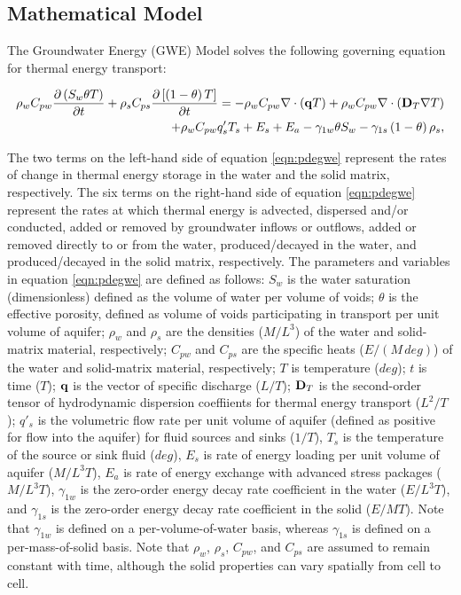 \subsection{Mathematical Model} \label{sec:mathmodel}

The Groundwater Energy (GWE) Model solves the following governing equation for thermal energy transport:

\begin{equation}
\label{eqn:pdegwe}
\begin{aligned}
\rho_w C_{pw} \frac {\partial \left ( S_w \theta T \right )}{\partial t}
+ \rho_s C_{ps} \frac {\partial \left [ \left (1 - \theta \right ) T \right ]}{\partial t}
= - \rho_w C_{pw} \nabla \cdot \left ( \mathbf{q} T  \right ) 
+ \rho_w C_{pw} \nabla \cdot \left ( \mathbf{D}_T \nabla T \right )\\
+ \rho_w C_{pw} q'_s T_s + E_s + E_a - \gamma_{1w} \theta S_w
- \gamma_{1s} \left (1 - \theta \right ) \rho_s,
\end{aligned}
\end{equation}

\noindent The two terms on the left-hand side of equation \ref{eqn:pdegwe} represent the rates of change in thermal energy storage in the water and the solid matrix, respectively. The six terms on the right-hand side of equation \ref{eqn:pdegwe} represent the rates at which thermal energy is advected, dispersed and/or conducted, added or removed by groundwater inflows or outflows, added or removed directly to or from the water, produced/decayed in the water, and produced/decayed in the solid matrix, respectively. The parameters and variables in equation \ref{eqn:pdegwe} are defined as follows: $S_w$ is the water saturation (dimensionless) defined as the volume of water per volume of voids; $\theta$ is the effective porosity, defined as volume of voids participating in transport per unit volume of aquifer; $\rho_w$ and $\rho_s$ are the densities ($M/L^3$) of the water and solid-matrix material, respectively; $C_{pw}$ and $C_{ps}$ are the specific heats ($E/(M \, deg)$) of the water and solid-matrix material, respectively; $T$ is temperature ($deg$); $t$ is time ($T$); $\mathbf{q}$ is the vector of specific discharge ($L/T$); $\mathbf{D}_T$ is the second-order tensor of hydrodynamic dispersion coeffiients for thermal energy transport ($L^2/T$); $q'_s$ is the volumetric flow rate per unit volume of aquifer (defined as positive for flow into the aquifer) for fluid sources and sinks ($1/T$), $T_s$ is the temperature of the source or sink fluid ($deg$), $E_s$ is rate of energy loading per unit volume of aquifer ($M/L^3T$), $E_a$ is rate of energy exchange with advanced stress packages ($M/L^3T$), $\gamma_{1w}$ is the zero-order energy decay rate coefficient in the water ($E/L^3T$), and $\gamma_{1s}$ is the zero-order energy decay rate coefficient in the solid ($E/MT$). Note that $\gamma_{1w}$ is defined on a per-volume-of-water basis, whereas $\gamma_{1s}$ is defined on a per-mass-of-solid basis. Note that $\rho_w$, $\rho_s$, $C_{pw}$, and $C_{ps}$ are assumed to remain constant with time, although the solid properties can vary spatially from cell to cell.

